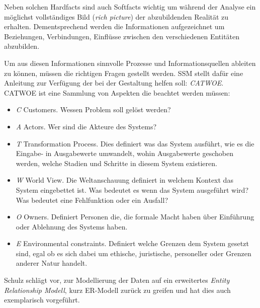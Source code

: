 Neben solchen Hardfacts sind auch Softfacts wichtig um während der Analyse ein möglichst vollständiges Bild (\textit{rich picture}) der abzubildenden Realität zu erhalten. Dementsprechend werden die Informationen aufgezeichnet um Beziehungen, Verbindungen, Einflüsse zwischen den verschiedenen Entitäten abzubilden.

Um aus diesen Informationen sinnvolle Prozesse und Informationsquellen ableiten zu können, müssen die richtigen Fragen gestellt werden. SSM stellt dafür eine Anleitung zur Verfügung der bei der Gestaltung helfen soll: \textit{CATWOE}. CATWOE ist eine Sammlung von Aspekten die beachtet werden müssen:
\begin{itemize}
	\item \textit{C} Customers. Wessen Problem soll gelöst werden?
	\item \textit{A} Actors. Wer sind die Akteure des Systems?
	\item \textit{T} Transformation Process. Dies definiert was das System ausführt, wie es die Eingabe- in Ausgabewerte umwandelt, wohin Ausgabewerte geschoben werden, welche Stadien und Schritte in diesem System existieren.
	\item \textit{W} World View. Die Weltanschauung definiert in welchem Kontext das System eingebettet ist. Was bedeutet es wenn das System ausgeführt wird? Was bedeutet eine Fehlfunktion oder ein Ausfall?
	\item \textit{O} Owners. Definiert Personen die, die formale Macht haben über Einführung oder Ablehnung des Systems haben.
	\item \textit{E} Environmental constraints. Definiert welche Grenzen dem System gesetzt sind, egal ob es sich dabei um ethische, juristische, personeller oder Grenzen anderer Natur handelt.
\end{itemize}

Schulz schlägt vor, zur Modellierung der Daten auf ein erweitertes \textit{Entity Relationship Modell}, kurz ER-Modell zurück zu greifen und hat dies auch exemplarisch vorgeführt. 


